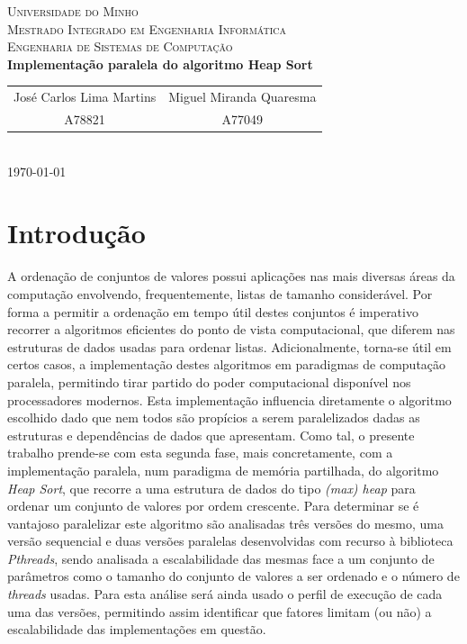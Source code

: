 \documentclass{article}
\begin{document}
{
\center
\textsc{\Large Universidade do Minho} \\ [0.5cm]
\textsc{\Large Mestrado Integrado em Engenharia Informática} \\ [0.5cm]
\textsc{\large Engenharia de Sistemas de Computação} \\ [0.5cm]

{\LARGE \bfseries Implementação paralela do algoritmo Heap Sort} \\[0.2cm]

\begin{tabular}{c c}
    José Carlos Lima Martins & Miguel Miranda Quaresma \\
    A78821 & A77049  \\
\end{tabular} \\[0.5cm]

\today \\[1cm]
}



\section{Introdução}
A ordenação de conjuntos de valores possui aplicações nas mais diversas áreas da computação envolvendo, frequentemente, listas
de tamanho considerável. Por forma a permitir a ordenação em tempo útil destes conjuntos é imperativo recorrer a algoritmos 
eficientes do ponto de vista computacional, que diferem nas estruturas de dados usadas para ordenar listas. 
Adicionalmente, torna-se útil em certos casos, a implementação destes algoritmos em paradigmas de computação paralela, permitindo
tirar partido do poder computacional disponível nos processadores modernos. Esta implementação influencia diretamente o algoritmo
escolhido dado que nem todos são propícios a serem paralelizados dadas as estruturas e dependências de dados que apresentam.
Como tal, o presente trabalho prende-se com esta segunda fase, mais concretamente, com a implementação paralela, num paradigma de memória 
partilhada, do algoritmo \textit{Heap Sort}, que recorre a uma estrutura de dados do tipo \textit{(max) heap} para ordenar um conjunto de 
valores por ordem crescente. Para determinar se é vantajoso paralelizar este algoritmo são analisadas três versões do mesmo, uma versão 
sequencial e duas versões paralelas desenvolvidas com recurso à biblioteca \textit{Pthreads}, sendo analisada a escalabilidade das mesmas
face a um conjunto de parâmetros como o tamanho do conjunto de valores a ser ordenado e o número de \textit{threads} usadas.
Para esta análise será ainda usado o perfil de execução de cada uma das versões, permitindo assim identificar que fatores limitam (ou não)
a escalabilidade das implementações em questão.
\end{document}
